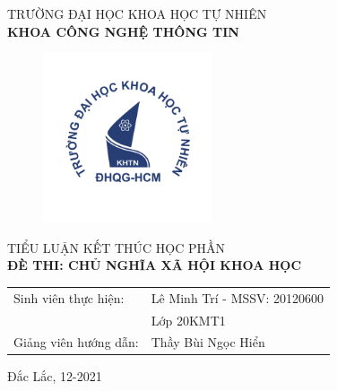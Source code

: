 \begin{titlepage}
\begin{center}
\vspace{-12pt}  TRƯỜNG ĐẠI HỌC KHOA HỌC TỰ NHIÊN \\
\textbf{\fontsize{16pt}{0pt}\selectfont KHOA CÔNG NGHỆ THÔNG TIN}
\vspace{0.5cm}
 \begin{figure}[H]
     \centering
     \includegraphics[width=5cm,height=5cm]{Images/hcmus_logo.png}
 \end{figure}
\vspace{3cm}
\fontsize{14pt}{0pt}\selectfont TIỂU LUẬN KẾT THÚC HỌC PHẦN\\
\vspace{12pt}
\textbf{\fontsize{14pt}{0pt}\selectfont ĐÈ THI: CHỦ NGHĨA XÃ HỘI KHOA HỌC}
\vspace{3cm}
\begin{table}[H]
    \centering
    \begin{tabular}{l l}
 \fontsize{14pt}{0pt}\selectfont Sinh viên thực hiện:    & \fontsize{14pt}{0pt}\selectfont Lê Minh Trí - MSSV: 20120600 \vspace{6pt} \\ 
     & \fontsize{14pt}{0pt}\selectfont Lớp 20KMT1\vspace{6pt}\\
\fontsize{14pt}{0pt}\selectfont Giảng viên hướng dẫn: & \fontsize{14pt}{0pt}\selectfont Thầy Bùi Ngọc Hiển \vspace{6pt}\\
\end{tabular}
\end{table}
\vspace{4cm}
 \fontsize{14pt}{0pt}\selectfont Đắc Lắc, 12-2021
\end{center}
\end{titlepage}
\clearpage
